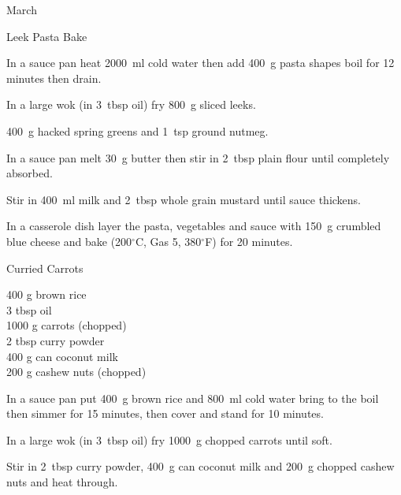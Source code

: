 \begin{menu}{March}
\begin{recipe}{2}{Leek Pasta Bake}
    \begin{instructions}
    \item 
      In a sauce pan heat
      2000~ml  cold water then add
      400~g  pasta shapes
      boil for 12
      minutes then drain.
    \item 
        In a large wok
        (in 3~tbsp  oil)
        fry
        800~g sliced leeks.
      \item 400~g hacked spring greens
        and
        1~tsp  ground nutmeg.
      \item 
        In a sauce pan melt
        30~g  butter
        then stir in
        2~tbsp  plain flour
        until completely absorbed.
      \item 
        Stir in
        400~ml  milk
        and
        2~tbsp  whole grain mustard
        until sauce thickens.
      \item 
        In a casserole dish
        layer the pasta, vegetables and sauce with
        150~g crumbled blue cheese
        and bake
        (200$^{\circ}$C, Gas 5, 380$^{\circ}$F)
        for 20 minutes.
      
    \end{instructions}
    \end{recipe}%
  
    \begin{recipe}{2}{Curried Carrots}%
		\begin{ingredients}
		400 g brown rice  \\
	3 tbsp oil  \\
	1000 g carrots (chopped) \\
	2 tbsp curry powder  \\
	400 g can coconut milk  \\
	200 g cashew nuts (chopped) \\
	
		\end{ingredients}
	
    \begin{instructions}
    \item 
      In a
      sauce pan
      put
      400~g  brown rice
      and
      800~ml  cold water
      bring to the boil then simmer for 15 minutes,
      then cover and stand for 10 minutes.
    \item 
        In a large wok
        (in 3~tbsp  oil)
        fry
        1000~g chopped carrots
        until soft.
      \item 
        Stir in
        2~tbsp  curry powder,
        400~g  can coconut milk
        and
        200~g chopped cashew nuts
        and heat through.
      

\end{instructions}
\end{recipe}
\end{menu}
